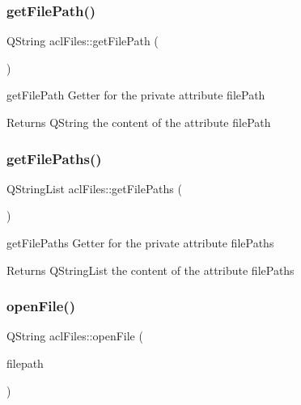 \subsubsection{\texorpdfstring{get\+File\+Path()}{getFilePath()}}
{\footnotesize\ttfamily Q\+String acl\+Files\+::get\+File\+Path (\begin{DoxyParamCaption}{ }\end{DoxyParamCaption})}



get\+File\+Path Getter for the private attribute file\+Path 

\begin{DoxyReturn}{Returns}
Q\+String the content of the attribute file\+Path 
\end{DoxyReturn}
\mbox{\label{classaclFiles_a6c2a63e14203a702eabad2f3d076c638}} 
\subsubsection{\texorpdfstring{get\+File\+Paths()}{getFilePaths()}}
{\footnotesize\ttfamily Q\+String\+List acl\+Files\+::get\+File\+Paths (\begin{DoxyParamCaption}{ }\end{DoxyParamCaption})}



get\+File\+Paths Getter for the private attribute file\+Paths 

\begin{DoxyReturn}{Returns}
Q\+String\+List the content of the attribute file\+Paths 
\end{DoxyReturn}
\mbox{\label{classaclFiles_ab1a51796d7112b2a223e968375ac4be0}} 
\subsubsection{\texorpdfstring{open\+File()}{openFile()}}
{\footnotesize\ttfamily Q\+String acl\+Files\+::open\+File (\begin{DoxyParamCaption}\item[{Q\+String}]{filepath }\end{DoxyParamCaption})}



